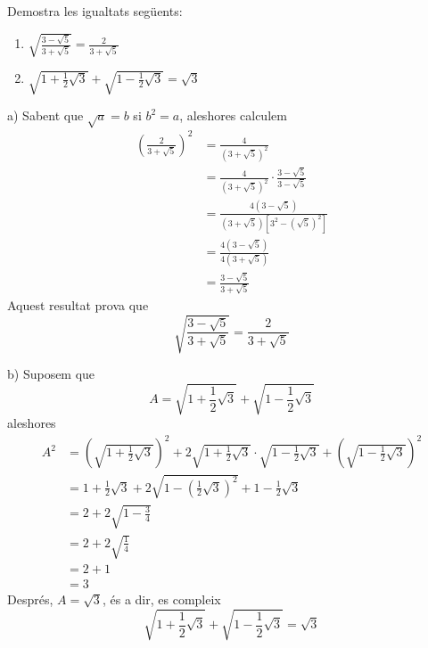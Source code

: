 \begin{exercici}
Demostra les igualtats següents:

\begin{enumerate}
\item[a)] $\sqrt{\frac{3-\sqrt{5}}{3+\sqrt{5}}}=\frac{2}{3+\sqrt{5}}$

\item[b)] $\sqrt{1+\frac{1}{2}\sqrt{3}}+\sqrt{1-\frac{1}{2}\sqrt{3}}=\sqrt{3}
$
\end{enumerate}

\end{exercici}

\begin{solucio}
a) Sabent que $\sqrt{a}=b$ si $b^{2}=a$, aleshores calculem 
\begin{align*}
\left( \frac{2}{3+\sqrt{5}}\right) ^{2} &=\frac{4}{(3+\sqrt{5})^{2}} \\
&=\frac{4}{(3+\sqrt{5})^{2}}\cdot \frac{3-\sqrt{5}}{3-\sqrt{5}} \\
&=\frac{4(3-\sqrt{5})}{(3+\sqrt{5})\left[ 3^{2}-\left( \sqrt{5}\right) ^{2}%
\right] } \\
&=\frac{4(3-\sqrt{5})}{4(3+\sqrt{5})} \\
&=\frac{3-\sqrt{5}}{3+\sqrt{5}}
\end{align*}%
Aquest resultat prova que%
\begin{equation*}
\sqrt{\frac{3-\sqrt{5}}{3+\sqrt{5}}}=\frac{2}{3+\sqrt{5}}
\end{equation*}

b) Suposem que%
\begin{equation*}
A=\sqrt{1+\frac{1}{2}\sqrt{3}}+\sqrt{1-\frac{1}{2}\sqrt{3}}
\end{equation*}%
aleshores%
\begin{align*}
A^{2} &=\left( \sqrt{1+\frac{1}{2}\sqrt{3}}\right) ^{2}+2\sqrt{1+\frac{1}{2}%
\sqrt{3}}\cdot \sqrt{1-\frac{1}{2}\sqrt{3}}+\left( \sqrt{1-\frac{1}{2}\sqrt{3%
}}\right) ^{2} \\
&=1+\frac{1}{2}\sqrt{3}+2\sqrt{1-\left( \frac{1}{2}\sqrt{3}\right) ^{2}}+1-%
\frac{1}{2}\sqrt{3} \\
&=2+2\sqrt{1-\frac{3}{4}} \\
&=2+2\sqrt{\frac{1}{4}} \\
&=2+1 \\
&=3
\end{align*}%
Després, $A=\sqrt{3}$, és a dir, es compleix%
\begin{equation*}
\sqrt{1+\frac{1}{2}\sqrt{3}}+\sqrt{1-\frac{1}{2}\sqrt{3}}=\sqrt{3}
\end{equation*}
\end{solucio}

